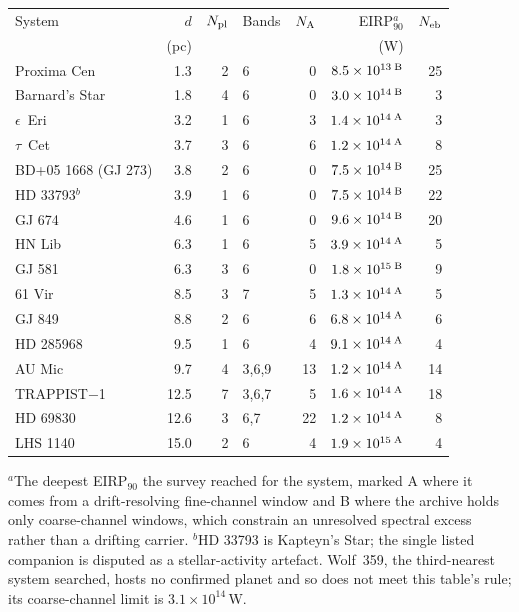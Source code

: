 \begin{tabular}{@{}l@{~~}r@{~~}r@{~~}l@{~~}r@{~~}r@{~~}r@{}}
\hline
System & $d$ & $N_{\rm pl}$ & Bands & $N_{\rm A}$ & EIRP$_{90}^{a}$ & $N_{\rm eb}$ \\
 & (pc) & & & & (W) & \\
\hline
Proxima Cen & 1.3 & 2 & 6 & 0 & $8.5\times10^{13}\,^{\rm B}$ & 25 \\
Barnard's Star & 1.8 & 4 & 6 & 0 & $3.0\times10^{14}\,^{\rm B}$ & 3 \\
$\epsilon$~Eri & 3.2 & 1 & 6 & 3 & $1.4\times10^{14}\,^{\rm A}$ & 3 \\
$\tau$~Cet & 3.7 & 3 & 6 & 6 & $1.2\times10^{14}\,^{\rm A}$ & 8 \\
BD+05 1668 (GJ 273) & 3.8 & 2 & 6 & 0 & $7.5\times10^{14}\,^{\rm B}$ & 25 \\
HD 33793$^{b}$ & 3.9 & 1 & 6 & 0 & $7.5\times10^{14}\,^{\rm B}$ & 22 \\
GJ 674 & 4.6 & 1 & 6 & 0 & $9.6\times10^{14}\,^{\rm B}$ & 20 \\
HN Lib & 6.3 & 1 & 6 & 5 & $3.9\times10^{14}\,^{\rm A}$ & 5 \\
GJ 581 & 6.3 & 3 & 6 & 0 & $1.8\times10^{15}\,^{\rm B}$ & 9 \\
61 Vir & 8.5 & 3 & 7 & 5 & $1.3\times10^{14}\,^{\rm A}$ & 5 \\
GJ 849 & 8.8 & 2 & 6 & 6 & $6.8\times10^{14}\,^{\rm A}$ & 6 \\
HD 285968 & 9.5 & 1 & 6 & 4 & $9.1\times10^{14}\,^{\rm A}$ & 4 \\
AU Mic & 9.7 & 4 & 3,6,9 & 13 & $1.2\times10^{14}\,^{\rm A}$ & 14 \\
TRAPPIST$-$1 & 12.5 & 7 & 3,6,7 & 5 & $1.6\times10^{14}\,^{\rm A}$ & 18 \\
HD 69830 & 12.6 & 3 & 6,7 & 22 & $1.2\times10^{14}\,^{\rm A}$ & 8 \\
LHS 1140 & 15.0 & 2 & 6 & 4 & $1.9\times10^{15}\,^{\rm A}$ & 4 \\
\hline
\end{tabular}

{\footnotesize $^{a}$The deepest EIRP$_{90}$ the survey reached for the system, marked A where it comes from a drift-resolving fine-channel window and B where the archive holds only coarse-channel windows, which constrain an unresolved spectral excess rather than a drifting carrier. $^{b}$HD 33793 is Kapteyn's Star; the single listed companion is disputed as a stellar-activity artefact. Wolf~359, the third-nearest system searched, hosts no confirmed planet and so does not meet this table's rule; its coarse-channel limit is $3.1\times10^{14}$\,W.}
